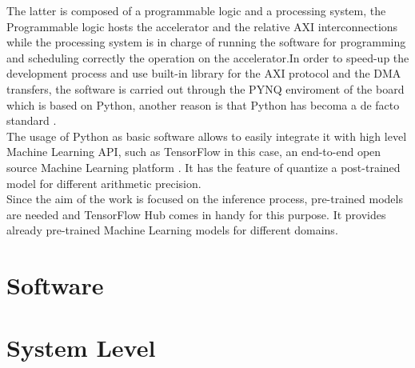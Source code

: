 The latter is composed of a programmable logic and a processing system, the Programmable logic hosts the accelerator and the relative AXI interconnections while the processing system is in charge of running the software for programming and scheduling correctly the operation on the accelerator.\newline In order to speed-up the development process and use built-in library for the AXI protocol and the DMA transfers, the software is carried out through the PYNQ enviroment of the board \cite{WEBSITE:2} which is based on Python, another reason is that Python has becoma a de facto standard \cite{paper:37}. \\
The usage of Python as basic software allows to easily integrate it with high level Machine Learning API, such as TensorFlow in this case, an end-to-end open source Machine Learning platform \cite{WEBSITE:4}. It has the feature of quantize a post-trained model for different arithmetic precision.\\
Since the aim of the work is focused on the inference process, pre-trained models are needed and TensorFlow Hub \cite{WEBSITE:5} comes in handy for this purpose. It provides already pre-trained Machine Learning models for different domains.

\section{Software}
\section{System Level}

